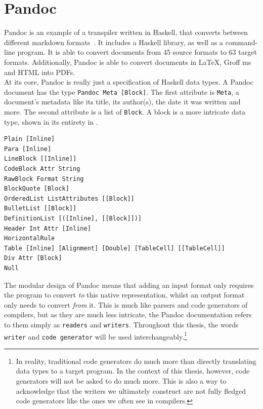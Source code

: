 \section{Pandoc}

Pandoc is an example of a transpiler written in Haskell, that converts between different markdown formats~\cite{whatIsPandoc}. It includes a Haskell library, as well as a command-line program. It is able to convert documents from 45 source formats to 63 target formats. Additionally, Pandoc is able to convert documents in LaTeX, Groff ms and HTML into PDFs. \\

At its core, Pandoc is really just a specification of Haskell data types. A Pandoc document has the type \texttt{Pandoc Meta [Block]}. The first attribute is \texttt{Meta}, a document's metadata like its title, its author(s), the date it was written and more. The second attribute is a list of \texttt{Block}. A block is a more intricate data type, shown in its entirety in . \\

\begin{lstlisting}[caption={The \texttt{Block} data type of Pandocs native representation.}, captionpos=b, label={Block data type in Pandoc}]
Plain [Inline]
Para [Inline]
LineBlock [[Inline]]
CodeBlock Attr String
RawBlock Format String
BlockQuote [Block]
OrderedList ListAttributes [[Block]]
BulletList [[Block]]
DefinitionList [([Inline], [[Block]])]
Header Int Attr [Inline]
HorizontalRule
Table [Inline] [Alignment] [Double] [TableCell] [[TableCell]]
Div Attr [Block]
Null
\end{lstlisting}

The modular design of Pandoc means that adding an input format only requires the program to convert \textit{to} this native representation, whilst an output format only needs to convert \textit{from} it. This is much like parsers and code generators of compilers, but as they are much less intricate, the Pandoc documentation refers to them simply as \texttt{readers} and \texttt{writers}. Throughout this thesis, the words \texttt{writer} and \texttt{code generator} will be used interchangeably.\footnote{In reality, traditional code generators do much more than directly translating data types to a target program. In the context of this thesis, however, code generators will not be asked to do much more. This is also a way to acknowledge that the writers we ultimately construct are not fully fledged code generators like the ones we often see in compilers.} \\

